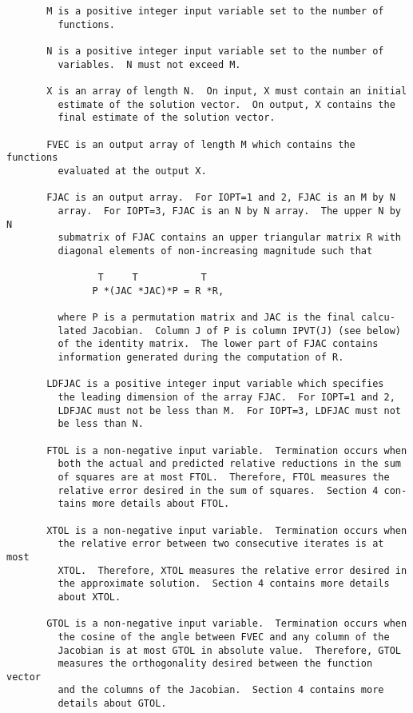 \begin{verbatim}
       M is a positive integer input variable set to the number of
         functions.

       N is a positive integer input variable set to the number of
         variables.  N must not exceed M.

       X is an array of length N.  On input, X must contain an initial
         estimate of the solution vector.  On output, X contains the
         final estimate of the solution vector.

       FVEC is an output array of length M which contains the functions
         evaluated at the output X.

       FJAC is an output array.  For IOPT=1 and 2, FJAC is an M by N
         array.  For IOPT=3, FJAC is an N by N array.  The upper N by N
         submatrix of FJAC contains an upper triangular matrix R with
         diagonal elements of non-increasing magnitude such that

                T     T           T
               P *(JAC *JAC)*P = R *R,

         where P is a permutation matrix and JAC is the final calcu-
         lated Jacobian.  Column J of P is column IPVT(J) (see below)
         of the identity matrix.  The lower part of FJAC contains
         information generated during the computation of R.

       LDFJAC is a positive integer input variable which specifies
         the leading dimension of the array FJAC.  For IOPT=1 and 2,
         LDFJAC must not be less than M.  For IOPT=3, LDFJAC must not
         be less than N.

       FTOL is a non-negative input variable.  Termination occurs when
         both the actual and predicted relative reductions in the sum
         of squares are at most FTOL.  Therefore, FTOL measures the
         relative error desired in the sum of squares.  Section 4 con-
         tains more details about FTOL.

       XTOL is a non-negative input variable.  Termination occurs when
         the relative error between two consecutive iterates is at most
         XTOL.  Therefore, XTOL measures the relative error desired in
         the approximate solution.  Section 4 contains more details
         about XTOL.

       GTOL is a non-negative input variable.  Termination occurs when
         the cosine of the angle between FVEC and any column of the
         Jacobian is at most GTOL in absolute value.  Therefore, GTOL
         measures the orthogonality desired between the function vector
         and the columns of the Jacobian.  Section 4 contains more
         details about GTOL.


\end{verbatim}
